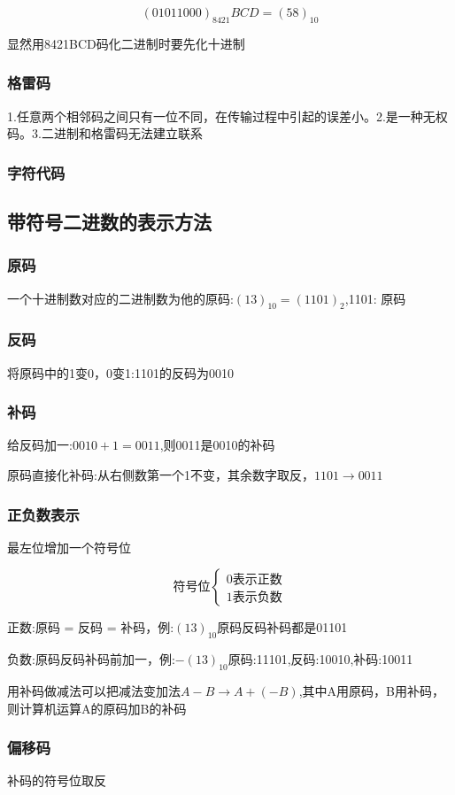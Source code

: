 \documentclass[11pt,twoside,a4paper]{ctexart}
\begin{document}
\[(0101 1000)_8421BCD = (58)_10  \]

显然用8421BCD码化二进制时要先化十进制

\subsubsection{格雷码}
1.任意两个相邻码之间只有一位不同，在传输过程中引起的误差小。2.是一种无权码。3.二进制和格雷码无法建立联系

\subsubsection{字符代码}

\subsection{带符号二进数的表示方法}
\subsubsection{原码}
一个十进制数对应的二进制数为他的原码:$(13)_10 = (1101)_2 $,1101: 原码
\subsubsection{反码}
将原码中的1变0，0变1:1101的反码为0010
\subsubsection{补码}
给反码加一:$0010 + 1 = 0011 $,则0011是0010的补码

原码直接化补码:从右侧数第一个1不变，其余数字取反，$1101 \rightarrow 0011 $
\subsubsection{正负数表示}
最左位增加一个符号位

\[ \text{符号位} 
\begin{cases}
0 \text{表示正数} \\
1 \text{表示负数}
\end{cases} \]

正数:原码 = 反码 = 补码，例:$(13)_10 $原码反码补码都是01101

负数:原码反码补码前加一，例:$-(13)_10 $原码:11101,反码:10010,补码:10011

用补码做减法可以把减法变加法$A - B \rightarrow A + (-B) $,其中A用原码，B用补码，则计算机运算A的原码加B的补码

\subsubsection{偏移码}
补码的符号位取反
\end{document}

